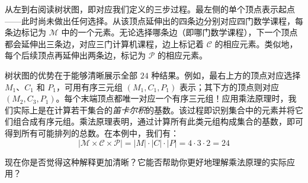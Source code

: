 \begin{example}
    \begin{center}
    \end{center}

    从左到右阅读树状图，即对应我们定义的三步过程。最左侧的单个顶点表示起点——此时尚未做出任何选择。从该顶点延伸出的四条边分别对应四门数学课程，每条边标记为 $\mathcal{M}$ 中的一个元素。无论选择哪条边（即哪门数学课程），下一个顶点都会延伸出三条边，对应三门计算机课程，边上标记着 $\mathcal{C}$ 的相应元素。类似地，每个后续顶点再延伸出两条边，标记为 $\mathcal{P}$ 的相应元素。

    树状图的优势在于能够清晰展示全部 $24$ 种结果。例如，最右上方的顶点对应选择 $M_1$、$C_1$ 和 $P_1$，可用有序三元组 $(M_1, C_1, P_1)$ 表示；其下方的顶点则对应 $(M_2, C_3, P_1)$。每个末端顶点都唯一对应一个有序三元组！应用乘法原理时，我们实际上是在计算若干集合的\emph{笛卡尔积}的基数。该过程即识别集合中的元素并将它们组合成有序元组。乘法原理表明，通过计算所有此类元组构成集合的基数，即可得到所有可能排列的总数。在本例中，我们有：
    \[|\mathcal{M} \times \mathcal{C} \times \mathcal{P}| = |M| \cdot |C| \cdot |P| = 4 \cdot 3 \cdot 2 = 24\]

    现在你是否觉得这种解释更加清晰？它能否帮助你更好地理解乘法原理的实际应用？
\end{example}

